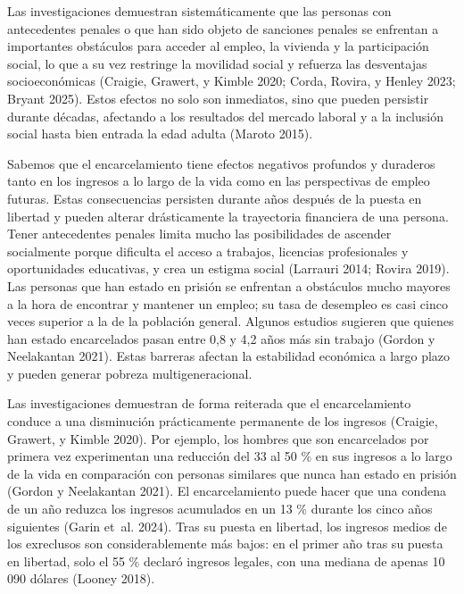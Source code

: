 \documentclass[
  spanish,
  letterpaper,
  DIV=11,
  numbers=noendperiod]{scrreprt}
\begin{document}
Las investigaciones demuestran sistemáticamente que las personas con
antecedentes penales o que han sido objeto de sanciones penales se
enfrentan a importantes obstáculos para acceder al empleo, la vivienda y
la participación social, lo que a su vez restringe la movilidad social y
refuerza las desventajas socioeconómicas (Craigie, Grawert, y Kimble
2020; Corda, Rovira, y Henley 2023; Bryant 2025). Estos efectos no solo
son inmediatos, sino que pueden persistir durante décadas, afectando a
los resultados del mercado laboral y a la inclusión social hasta bien
entrada la edad adulta (Maroto 2015).

Sabemos que el encarcelamiento tiene efectos negativos profundos y
duraderos tanto en los ingresos a lo largo de la vida como en las
perspectivas de empleo futuras. Estas consecuencias persisten durante
años después de la puesta en libertad y pueden alterar drásticamente la
trayectoria financiera de una persona. Tener antecedentes penales limita
mucho las posibilidades de ascender socialmente porque dificulta el
acceso a trabajos, licencias profesionales y oportunidades educativas, y
crea un estigma social (Larrauri 2014; Rovira 2019). Las personas que
han estado en prisión se enfrentan a obstáculos mucho mayores a la hora
de encontrar y mantener un empleo; su tasa de desempleo es casi cinco
veces superior a la de la población general. Algunos estudios sugieren
que quienes han estado encarcelados pasan entre 0,8 y 4,2 años más sin
trabajo (Gordon y Neelakantan 2021). Estas barreras afectan la
estabilidad económica a largo plazo y pueden generar pobreza
multigeneracional.

Las investigaciones demuestran de forma reiterada que el encarcelamiento
conduce a una disminución prácticamente permanente de los ingresos
(Craigie, Grawert, y Kimble 2020). Por ejemplo, los hombres que son
encarcelados por primera vez experimentan una reducción del 33 al 50 \%
en sus ingresos a lo largo de la vida en comparación con personas
similares que nunca han estado en prisión (Gordon y Neelakantan 2021).
El encarcelamiento puede hacer que una condena de un año reduzca los
ingresos acumulados en un 13 \% durante los cinco años siguientes (Garin
et~al. 2024). Tras su puesta en libertad, los ingresos medios de los
exreclusos son considerablemente más bajos: en el primer año tras su
puesta en libertad, solo el 55 \% declaró ingresos legales, con una
mediana de apenas 10 090 dólares (Looney 2018).
\end{document}
